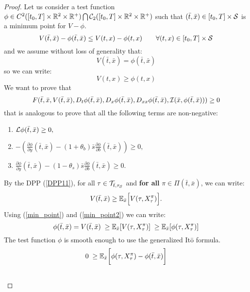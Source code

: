 \begin{proof}
Let us consider a test function $ \phi \in C^2([t_0,T] \times \mathbb{R}^2\times \mathbb{R}^+) \bigcap \mathcal{C}_2([t_0,T] \times \mathbb{R}^2\times \mathbb{R}^+)$ such that 
$(\bar t,\bar x) \in [t_0,T] \times \mathcal{S}$  is a minimum point for $V-\phi$.\\
\begin{equation}
 V(\bar t,\bar x) - \phi(\bar t,\bar x) \leq V(t,x) - \phi(t, x) \hspace{2em} \forall (t,x) \in [t_0,T] \times \mathcal{S}
\end{equation}
and we assume without loss of generality that:
\begin{equation}\label{min_point}
V(\bar t,\bar x) = \phi(\bar t,\bar x)  
\end{equation}
so we can write:
\begin{equation}\label{min_point2}
V(t,x) \geq \phi(t, x) 
\end{equation}
We want to prove that
$$ F(\bar t,\bar x,V(\bar t, \bar x),D_t \phi(\bar t, \bar x),D_x \phi(\bar t, \bar x),D_{xx}\phi(\bar t, \bar x),
\mathcal{I}(\bar x,\phi(\bar t, \bar x))) \geq 0  $$
that is analogous to prove that all the following terms are non-negative:
\begin{enumerate}
 \item 
 $ \mathcal{L} \phi(\bar t, \bar x) \geq 0 ,$
 \item $-\left(\frac{\partial \phi}{\partial y}(\bar t, \bar x)
 -(1+\theta_b) \bar s \frac{\partial \phi}{\partial b}(\bar t, \bar x)\right) \geq 0,$
 \item $\frac{\partial \phi}{\partial y}(\bar t, \bar x)-(1-\theta_s) \bar s \frac{\partial \phi}{\partial b}(\bar t, \bar x) \geq 0.$
\end{enumerate}
By the DPP (\ref{DPP11}), for all $\tau \in \mathcal{T}_{\bar t,\tau_{\mathcal{S}}}$ and \textbf{for all} $\pi \in \Pi(\bar t, \bar x)$, we can write:
\begin{equation}
  V(\bar t, \bar x) \geq \mathbb{E}_{\bar x} \Bigl[ V(\tau, X^{\pi}_{\tau}) \Bigr].
\end{equation}
Using (\ref{min_point}) and (\ref{min_point2}) we can write:
\begin{equation*}
 \phi(\bar t, \bar x) = V(\bar t, \bar x) \; \geq \mathbb{E}_{\bar x}[V(\tau, X^{\pi}_{\tau})] \; 
 \geq \mathbb{E}_{\bar x}[\phi(\tau, X^{\pi}_{\tau})]
\end{equation*}
The test function $\phi$ is smooth enough to use the generalized It\=o formula.
\begin{align}\label{first_inequality2}
 0 \; \geq & \; \E_{\bar x} \biggl[ \phi(\tau, X^{\pi}_{\tau}) - \phi(\bar t, \bar x) \biggr] \\ \nonumber

\end{align}
\end{proof}
